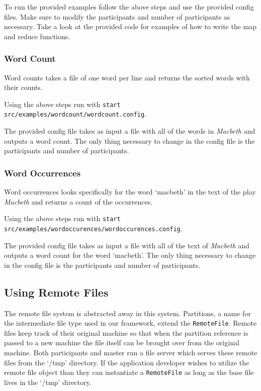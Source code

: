 \documentclass[12pt]{article}
\newcommand{\ttt}{\texttt}
\begin{document}
To run the provided examples follow the above steps and use the provided config files. Make sure to modify the participants and number of participants as necessary. Take a look at the provided code for examples of how to write the map and reduce functions.

\subsubsection{Word Count}
Word counts takes a file of one word per line and returns the sorted words with their counts. 

Using the above steps run with \ttt{start src/examples/wordcount/wordcount.config}.

The provided config file takes as input a file with all of the words in \textit{Macbeth} and outputs a word count. The only thing necessary to change in the config file is the participants and number of participants.

\subsubsection{Word Occurrences}
Word occurrences looks specifically for the word `macbeth' in the text of the play \textit{Macbeth} and returns a count of the occurrences.

Using the above steps run with \ttt{start src/examples/wordoccurences/wordoccurences.config}.

The provided config file takes as input a file with all of the text of \textit{Macbeth} and outputs a word count for the word `macbeth'. The only thing necessary to change in the config file is the participants and number of participants.

\subsection{Using Remote Files}

The remote file system is abstracted away in this system. Partitions, a name for the intermediate file type used in our framework, extend the \ttt{RemoteFile}. Remote files keep track of their original machine so that when the partition reference is passed to a new machine the file itself can be brought over from the original machine. Both participants and master run a file server which serves these remote files from the `/tmp' directory. If the application developer wishes to utilize the remote file object than they can instantiate a \ttt{RemoteFile} as long as the base file lives in the `/tmp' directory.
\end{document}
